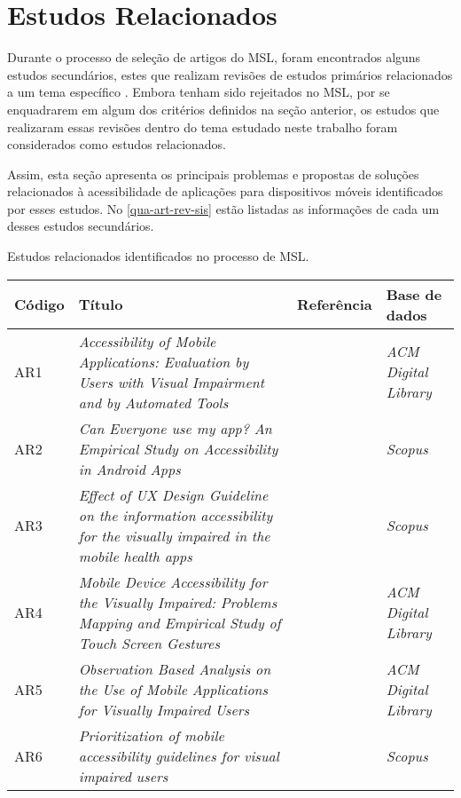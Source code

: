 \section{Estudos Relacionados}

Durante o processo de seleção de artigos do MSL, foram encontrados alguns estudos secundários, estes que realizam revisões de estudos primários
relacionados a um tema específico \cite{Kitchenham2007}. Embora tenham sido rejeitados no MSL, por se enquadrarem em algum dos critérios definidos
na seção anterior, os estudos que realizaram essas revisões dentro do tema estudado neste trabalho foram considerados como estudos relacionados.

Assim, esta seção apresenta os principais problemas e propostas de soluções relacionados à acessibilidade de aplicações para dispositivos móveis
identificados por esses estudos. No \autoref{qua-art-rev-sis} estão listadas as informações de cada um desses estudos secundários.

\begin{quadro}[htb!]
  \caption{\label{qua-art-rev-sis}Estudos relacionados identificados no processo de MSL.}
  \begin{tabular}{|m{1.2cm} | m{8.1cm} | m{2.7cm} | m{2.5cm}|}
    \hline
    \textbf{Código} & \textbf{Título}                                                                                                             & \textbf{Referência}  & \textbf{Base de dados}     \\
    \hline
    AR1             & \emph{Accessibility of Mobile Applications: Evaluation by Users with Visual Impairment and by Automated Tools}              & \cite{Mateus2020}    & \emph{ACM Digital Library} \\
    \hline
    AR2             & \emph{Can Everyone use my app? An Empirical Study on Accessibility in Android Apps}                                         & \cite{Vendome201941} & \emph{Scopus}              \\
    \hline
    AR3             & \emph{Effect of UX Design Guideline on the information accessibility for the visually impaired in the mobile health apps}   & \cite{Kim20191103}   & \emph{Scopus}              \\
    \hline
    AR4             & \emph{Mobile Device Accessibility for the Visually Impaired: Problems Mapping and Empirical Study of Touch Screen Gestures} & \cite{Damaceno2016}  & \emph{ACM Digital Library} \\
    \hline
    AR5             & \emph{Observation Based Analysis on the Use of Mobile Applications for Visually Impaired Users}                             & \cite{Siebra2016}    & \emph{ACM Digital Library} \\
    \hline
    AR6             & \emph{Prioritization of mobile accessibility guidelines for visual impaired users}                                          & \cite{Quispe2020}    & \emph{Scopus}              \\
    \hline
  \end{tabular}
\end{quadro}

